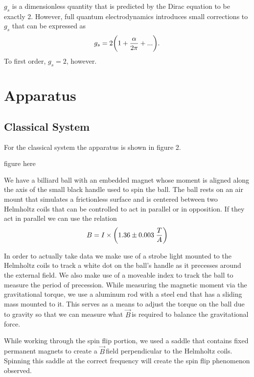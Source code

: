 \documentclass{article}
\newcommand{\B}{$\vec{B}\,$}
\begin{document}
	\vspace{.25cm}

	$g_s$ is a dimensionless quantity that is predicted by the Dirac equation to be exactly 2.  However, full quantum electrodynamics introduces small corrections to $g_s$ that can be expressed as
	\begin{equation*}
		g_s = 2\bigg{(}1+\frac{\alpha}{2\pi} + ...\bigg{)}.
	\end{equation*}
	To first order, $g_s = 2$, however.




\section{Apparatus}
	\subsection{Classical System}
	For the classical system the apparatus is shown in figure 2.

	figure here

	We have a billiard ball with an embedded magnet whose moment is aligned along the axis of the small black handle used to spin the ball.  The ball rests on an air mount that simulates a frictionless surface and is centered between two Helmholtz coils that can be controlled to act in parallel or in opposition.  If they act in parallel we can use the relation
	\begin{equation*}
		B = I \times \bigg{(}1.36 \pm 0.003 \hspace{.1cm} \frac{T}{A}\bigg{)}
	\end{equation*}

	In order to actually take data we make use of a strobe light mounted to the Helmholtz coils to track a white dot on the ball's handle as it precesses around the external field.  We also make use of a moveable index to track the ball to measure the period of precession.  While measuring the magnetic moment via the gravitational torque, we use a aluminum rod with a steel end that has a sliding mass mounted to it.  This serves as a means to adjust the torque on the ball due to gravity so that we can measure what \B is required to balance the gravitational force.

	While working through the spin flip portion, we used a saddle that contains fixed permanent magnets to create a \B field perpendicular to the Helmholtz coils.  Spinning this saddle at the correct frequency will create the spin flip phenomenon observed.
\end{document}
